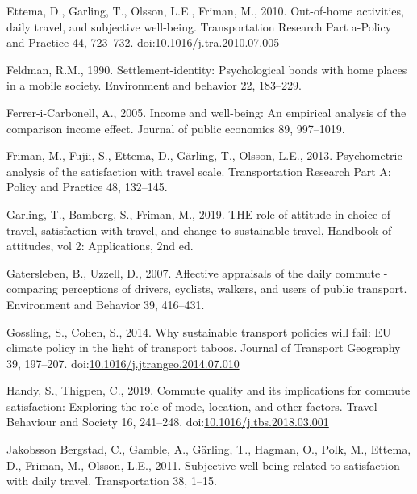 \documentclass[]{elsarticle} %
\begin{document}
\leavevmode\hypertarget{ref-Ettema2010out}{}%
Ettema, D., Garling, T., Olsson, L.E., Friman, M., 2010. Out-of-home
activities, daily travel, and subjective well-being. Transportation
Research Part a-Policy and Practice 44, 723--732.
doi:\href{https://doi.org/10.1016/j.tra.2010.07.005}{10.1016/j.tra.2010.07.005}

\leavevmode\hypertarget{ref-Feldman1990settlement}{}%
Feldman, R.M., 1990. Settlement-identity: Psychological bonds with home
places in a mobile society. Environment and behavior 22, 183--229.

\leavevmode\hypertarget{ref-Ferrer2005income}{}%
Ferrer-i-Carbonell, A., 2005. Income and well-being: An empirical
analysis of the comparison income effect. Journal of public economics
89, 997--1019.

\leavevmode\hypertarget{ref-Friman2013psychometric}{}%
Friman, M., Fujii, S., Ettema, D., Gärling, T., Olsson, L.E., 2013.
Psychometric analysis of the satisfaction with travel scale.
Transportation Research Part A: Policy and Practice 48, 132--145.

\leavevmode\hypertarget{ref-Garling2019role}{}%
Garling, T., Bamberg, S., Friman, M., 2019. THE role of attitude in
choice of travel, satisfaction with travel, and change to sustainable
travel, Handbook of attitudes, vol 2: Applications, 2nd ed.

\leavevmode\hypertarget{ref-Gatersleben2007affective}{}%
Gatersleben, B., Uzzell, D., 2007. Affective appraisals of the daily
commute - comparing perceptions of drivers, cyclists, walkers, and users
of public transport. Environment and Behavior 39, 416--431.

\leavevmode\hypertarget{ref-Gossling2014sustainable}{}%
Gossling, S., Cohen, S., 2014. Why sustainable transport policies will
fail: EU climate policy in the light of transport taboos. Journal of
Transport Geography 39, 197--207.
doi:\href{https://doi.org/10.1016/j.jtrangeo.2014.07.010}{10.1016/j.jtrangeo.2014.07.010}

\leavevmode\hypertarget{ref-Handy2019commute}{}%
Handy, S., Thigpen, C., 2019. Commute quality and its implications for
commute satisfaction: Exploring the role of mode, location, and other
factors. Travel Behaviour and Society 16, 241--248.
doi:\href{https://doi.org/10.1016/j.tbs.2018.03.001}{10.1016/j.tbs.2018.03.001}

\leavevmode\hypertarget{ref-Bergstad2011subjective}{}%
Jakobsson Bergstad, C., Gamble, A., Gärling, T., Hagman, O., Polk, M.,
Ettema, D., Friman, M., Olsson, L.E., 2011. Subjective well-being
related to satisfaction with daily travel. Transportation 38, 1--15.
\end{document}
